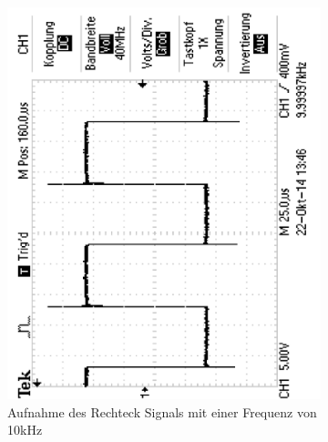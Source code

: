 \documentclass[12pt,a4paper]{article}
\begin{document}
\begin{figure}[H]
\begin{subfigure}[b]{0.28\textwidth}
                \includegraphics[width=\textwidth , scale = 0.4, angle = -90]{2_1_rech_10khz.pdf}
                \caption[Aufnahme des Rechtecksignals mit einer Frequenz von 10kHz]{Aufnahme des Rechteck Signals mit einer Frequenz von 10kHz}
                \label{fig:2_1_rech_10khz}
        \end{subfigure}
        \hfill
        \begin{subfigure}[b]{0.28\textwidth}

\end{subfigure}
\end{figure}
\end{document}
